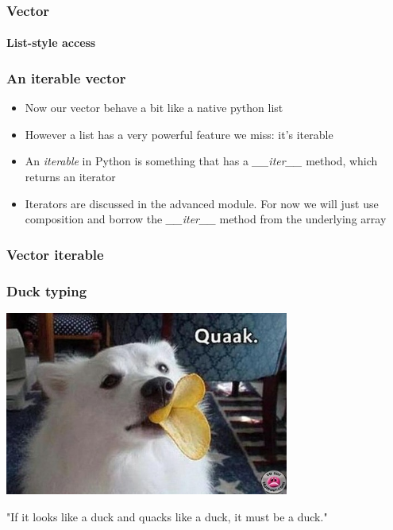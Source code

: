 \documentclass[9pt]{beamer}
\begin{document}
\begin{frame}
  \frametitle{Vector}
  \framesubtitle{List-style access}
  
\end{frame}


\begin{frame}
  \frametitle{An iterable vector}
  
  \begin{itemize}
    \item Now our vector behave a bit like a native python list
    \medskip
    \item However a list has a very powerful feature we miss: it's \alert{iterable}
    \medskip
    \item An \emph{iterable} in Python is something that has a \emph{\_\_iter\_\_}
          method, which returns an \alert{iterator}
    \medskip
    \item Iterators are discussed in the advanced module. For now we will just use
          composition and borrow the \emph{\_\_iter\_\_} method from the 
          underlying array
  \end{itemize}
  
\end{frame}

\begin{frame}
  \frametitle{Vector iterable}
  
\end{frame}


\begin{frame}
  \frametitle{Duck typing}
  
  \centering
  \includegraphics[width=0.7\textwidth]{quack.png}  
  
  \bigskip
  
  \centering
  "If it looks like a duck and quacks like a duck, it must be a duck."
  
\end{frame}
\end{document}

